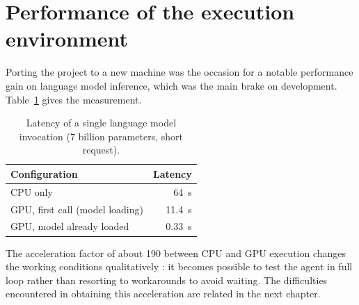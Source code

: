 \section{Performance of the execution environment}
\label{sec:latence}

Porting the project to a new machine was the occasion for a notable performance
gain on language model inference, which was the main brake on development.
Table~\ref{tab:latence} gives the measurement.

\begin{table}[htbp]
\centering
\caption[Latency of a model invocation]{Latency of a single language model
invocation (\num{7} billion parameters, short request).}
\label{tab:latence}
\begin{tabularx}{0.85\textwidth}{@{}Xr@{}}
\toprule
\textbf{Configuration} & \textbf{Latency}\\
\midrule
CPU only & \SI{64}{\second}\\
GPU, first call (model loading) & \SI{11.4}{\second}\\
GPU, model already loaded & \SI{0.33}{\second}\\
\bottomrule
\end{tabularx}
\end{table}

The acceleration factor of about \num{190} between CPU and GPU execution changes
the working conditions qualitatively : it becomes possible to test the agent in
full loop rather than resorting to workarounds to avoid waiting. The
difficulties encountered in obtaining this acceleration are related in the next
chapter.

\clearpage
